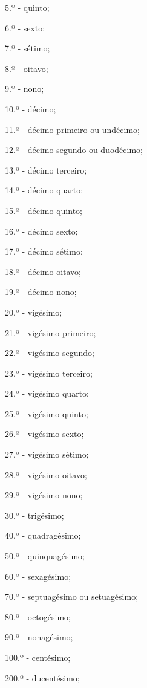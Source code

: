 \begin{multicols*}{2}
\begin{enumerate}
              5.º - quinto;

              6.º - sexto;

              7.º - sétimo;

              8.º - oitavo;

              9.º - nono;

              10.º - décimo;

              11.º - décimo primeiro ou undécimo;

              12.º - décimo segundo ou duodécimo;

              13.º - décimo terceiro;

              14.º - décimo quarto;

              15.º - décimo quinto;

              16.º - décimo sexto;

              17.º - décimo sétimo;

              18.º - décimo oitavo;

              19.º - décimo nono;

              20.º - vigésimo;

              21.º - vigésimo primeiro;

              22.º - vigésimo segundo;

              23.º - vigésimo terceiro;

              24.º - vigésimo quarto;

              25.º - vigésimo quinto;

              26.º - vigésimo sexto;

              27.º - vigésimo sétimo;

              28.º - vigésimo oitavo;

              29.º - vigésimo nono;

              30.º - trigésimo;

              40.º - quadragésimo;

              50.º - quinquagésimo;

              60.º - sexagésimo;

              70.º - septuagésimo ou setuagésimo;

              80.º - octogésimo;

              90.º - nonagésimo;

              100.º - centésimo;

              200.º - ducentésimo;


\end{enumerate}
\end{multicols*}
